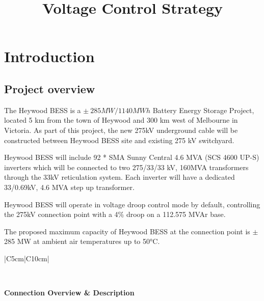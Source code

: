 \documentclass{../grid-link-report}
\title{Voltage Control Strategy}
\begin{document}
	
	\frontmatter
	\maketitle
	
	\makedisclaimer
	\clearpage
	\tableofcontents
	\makerevisionhistorypage
	
	\mainmatter
	
	\chapter{Introduction}
	
	\section{Project overview}
	The \ac{Heywood BESS} is a $\pm~285MW/1140MWh$ Battery Energy Storage Project, located 5 km from the town of Heywood and 300 km west of Melbourne in Victoria. As part of this project, the new  275kV underground cable will be constructed between \ac{Heywood BESS} site and existing 275 kV switchyard.

\ac{Heywood BESS} will include 92 * SMA Sunny Central 4.6 MVA (SCS 4600 UP-S) inverters which will be connected to two 275/33/33 kV, 160MVA transformers through the 33kV reticulation system. Each inverter will have a dedicated 33/0.69kV, 4.6 MVA step up transformer.

\ac{Heywood BESS} will operate in voltage droop control mode by default, controlling the 275kV connection point with a 4\% droop on a 112.575 MVAr base.

The proposed maximum capacity of \ac{Heywood BESS} at the connection point is $\pm$ 285 MW at ambient air temperatures up to 50°C. 

{
	\thicktablelines
	\begin{longtable}{|C{5cm}|C{10cm}|} 
		\caption{Connection Overview}
		\label{tab:connection-overview}
		\\	
		\toprule
		
		\bfseries \color{white}Connection Overview & \bfseries \color{white}Description\\
		\endhead
		\bottomrule \endfoot
		\\\hline
	\end{longtable}
}
\end{document}
